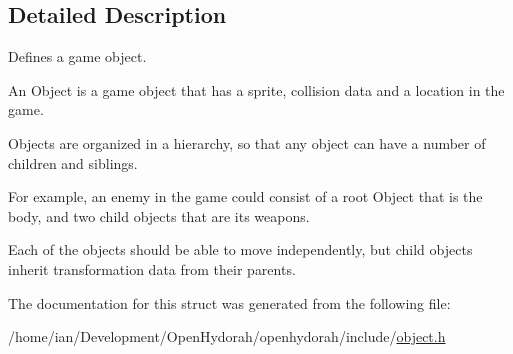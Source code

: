 \subsection{Detailed Description}
Defines a game object. 

An Object is a game object that has a sprite, collision data and a location in the game.

Objects are organized in a hierarchy, so that any object can have a number of children and siblings.

For example, an enemy in the game could consist of a root Object that is the body, and two child objects that are its weapons.

Each of the objects should be able to move independently, but child objects inherit transformation data from their parents. 

The documentation for this struct was generated from the following file\-:\begin{DoxyCompactItemize}
\item 
/home/ian/\-Development/\-Open\-Hydorah/openhydorah/include/\hyperlink{object_8h}{object.\-h}\end{DoxyCompactItemize}
